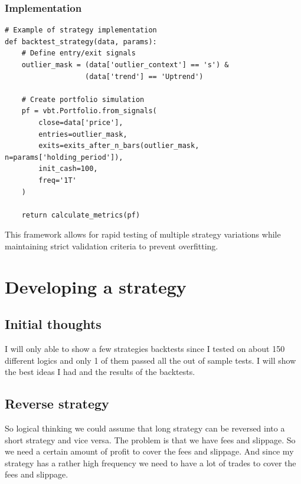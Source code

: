 \documentclass[12pt]{article}
\begin{document}
\subsubsection*{Implementation}
\begin{verbatim}
# Example of strategy implementation
def backtest_strategy(data, params):
    # Define entry/exit signals
    outlier_mask = (data['outlier_context'] == 's') & 
                   (data['trend'] == 'Uptrend')
    
    # Create portfolio simulation
    pf = vbt.Portfolio.from_signals(
        close=data['price'],
        entries=outlier_mask,
        exits=exits_after_n_bars(outlier_mask, n=params['holding_period']),
        init_cash=100,
        freq='1T'
    )
    
    return calculate_metrics(pf)
\end{verbatim}

This framework allows for rapid testing of multiple strategy variations while maintaining strict validation criteria to prevent overfitting.












\newpage
\section{Developing a strategy}

\subsection{Initial thoughts}

I will only able to show a few strategies backtests since I tested on about 150 different logics and only 1 of them passed all the out of sample tests. I will show the best ideas I had and the results of the backtests.


\subsection{Reverse strategy}
So logical thinking we could assume that long strategy can be reversed into a short strategy and vice versa. The problem is that we have fees and slippage. So we need a certain amount of profit to cover the fees and slippage. And since my strategy has a rather high frequency we need to have a lot of trades to cover the fees and slippage.
\end{document}
